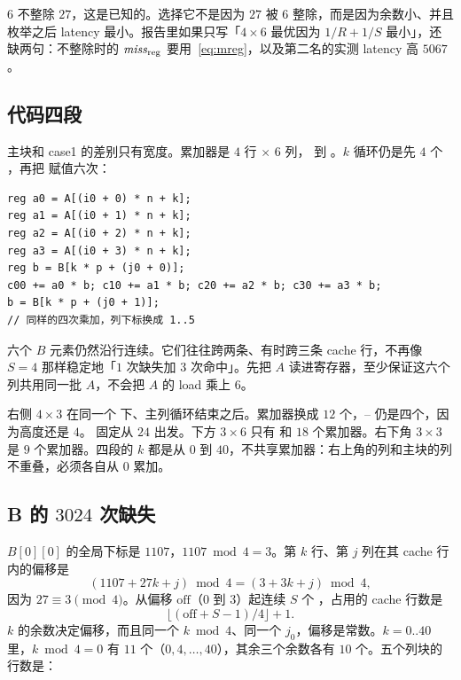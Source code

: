 $6$ 不整除 $27$，这是已知的。选择它不是因为 $27$ 被 $6$ 整除，而是因为余数小、并且枚举之后 latency 最小。报告里如果只写「$4\times6$ 最优因为 $1/R+1/S$ 最小」，还缺两句：不整除时的 $\mathit{miss}_{\mathrm{reg}}$ 要用~\eqref{eq:mreg}，以及第二名的实测 latency 高 $5067$。

\subsection{代码四段}

主块和 case1 的差别只有宽度。累加器是 $4$ 行 $\times$ $6$ 列， 到 。$k$ 循环仍是先 $4$ 个 ，再把  赋值六次：

\begin{lstlisting}
reg a0 = A[(i0 + 0) * n + k];
reg a1 = A[(i0 + 1) * n + k];
reg a2 = A[(i0 + 2) * n + k];
reg a3 = A[(i0 + 3) * n + k];
reg b = B[k * p + (j0 + 0)];
c00 += a0 * b; c10 += a1 * b; c20 += a2 * b; c30 += a3 * b;
b = B[k * p + (j0 + 1)];
// 同样的四次乘加，列下标换成 1..5
\end{lstlisting}

六个 $B$ 元素仍然沿行连续。它们往往跨两条、有时跨三条 cache 行，不再像 $S=4$ 那样稳定地「$1$ 次缺失加 $3$ 次命中」。先把 $A$ 读进寄存器，至少保证这六个列共用同一批 $A$，不会把 $A$ 的 load 乘上 $6$。

右侧 $4\times3$ 在同一个  下、主列循环结束之后。累加器换成 $12$ 个，-- 仍是四个，因为高度还是 $4$。 固定从 $24$ 出发。下方 $3\times6$ 只有  和 $18$ 个累加器。右下角 $3\times3$ 是 $9$ 个累加器。四段的 $k$ 都是从 $0$ 到 $40$，不共享累加器：右上角的列和主块的列不重叠，必须各自从 $0$ 累加。

\subsection{B 的 \texorpdfstring{$3024$}{3024} 次缺失}
\label{sec:c3miss}

$B[0][0]$ 的全局下标是 $1107$，$1107\bmod 4=3$。第 $k$ 行、第 $j$ 列在其 cache 行内的偏移是
\[
(1107+27k+j)\bmod 4=(3+3k+j)\bmod 4,
\]
因为 $27\equiv 3\pmod 4$。从偏移 $\mathrm{off}$（$0$ 到 $3$）起连续 $S$ 个 ，占用的 cache 行数是
\begin{equation}
\label{eq:span}
\lfloor(\mathrm{off}+S-1)/4\rfloor+1.
\end{equation}
$k$ 的余数决定偏移，而且同一个 $k\bmod 4$、同一个 $j_0$，偏移是常数。$k=0..40$ 里，$k\bmod 4=0$ 有 $11$ 个（$0,4,\ldots,40$），其余三个余数各有 $10$ 个。五个列块的行数是：

